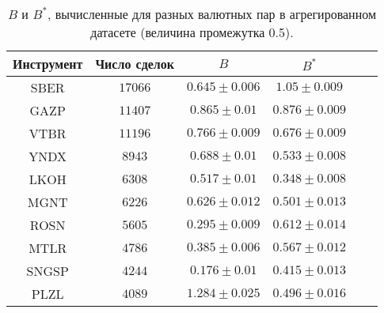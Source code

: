 \begin{table}[h!]
    \begin{center}
        \begin{tabular}{|c|c|c|c|c|c|}
            \hline
            Инструмент & Число сделок & $B$               & $B ^*$            \\ \hline
            SBER & $17066$ & $0.645 \pm 0.006$ & $1.05 \pm 0.009$ \\ \hline
            GAZP       & $11407$      & $0.865 \pm 0.01$  & $0.876 \pm 0.009$ \\ \hline
            VTBR       & $11196$      & $0.766 \pm 0.009$ & $0.676 \pm 0.009$ \\ \hline
            YNDX       & $8943$       & $0.688 \pm 0.01$  & $0.533 \pm 0.008$ \\ \hline
            LKOH       & $6308$       & $0.517 \pm 0.01$  & $0.348 \pm 0.008$ \\ \hline
            MGNT       & $6226$       & $0.626 \pm 0.012$ & $0.501 \pm 0.013$ \\ \hline
            ROSN       & $5605$       & $0.295 \pm 0.009$ & $0.612 \pm 0.014$ \\ \hline
            MTLR       & $4786$       & $0.385 \pm 0.006$ & $0.567 \pm 0.012$ \\ \hline
            SNGSP      & $4244$       & $0.176 \pm 0.01$  & $0.415 \pm 0.013$ \\ \hline
            PLZL       & $4089$       & $1.284 \pm 0.025$ & $0.496 \pm 0.016$ \\ \hline
        \end{tabular}
    \end{center}\caption{$B$ и $B ^*$, вычисленные для разных валютных пар в агрегированном датасете (величина промежутка 0.5).}
    \label{Aggreg1CU0.5} \end{table}

